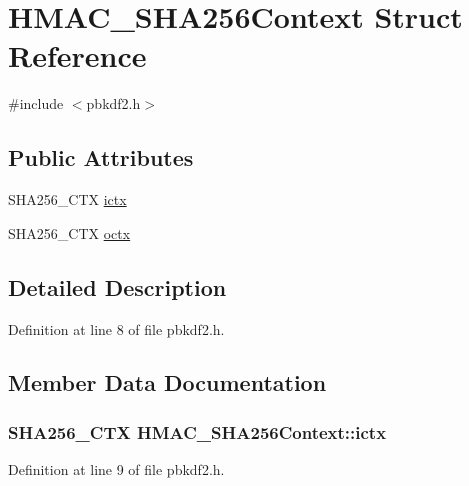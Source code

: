 \hypertarget{struct_h_m_a_c___s_h_a256_context}{}\section{H\+M\+A\+C\+\_\+\+S\+H\+A256\+Context Struct Reference}
\label{struct_h_m_a_c___s_h_a256_context}


{\ttfamily \#include $<$pbkdf2.\+h$>$}

\subsection*{Public Attributes}
\begin{DoxyCompactItemize}
\item 
S\+H\+A256\+\_\+\+C\+T\+X \hyperlink{struct_h_m_a_c___s_h_a256_context_a3433296fae8500c793388994de730f3c}{ictx}
\item 
S\+H\+A256\+\_\+\+C\+T\+X \hyperlink{struct_h_m_a_c___s_h_a256_context_a699abe00837406f312a95226741137f4}{octx}
\end{DoxyCompactItemize}


\subsection{Detailed Description}


Definition at line 8 of file pbkdf2.\+h.



\subsection{Member Data Documentation}
\hypertarget{struct_h_m_a_c___s_h_a256_context_a3433296fae8500c793388994de730f3c}{}
\subsubsection[{ictx}]{\setlength{\rightskip}{0pt plus 5cm}S\+H\+A256\+\_\+\+C\+T\+X H\+M\+A\+C\+\_\+\+S\+H\+A256\+Context\+::ictx}\label{struct_h_m_a_c___s_h_a256_context_a3433296fae8500c793388994de730f3c}


Definition at line 9 of file pbkdf2.\+h.

\hypertarget{struct_h_m_a_c___s_h_a256_context_a699abe00837406f312a95226741137f4}{}
